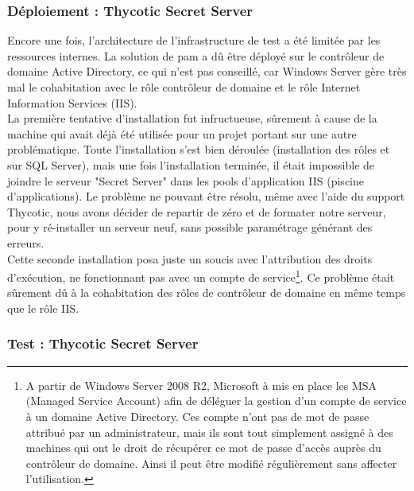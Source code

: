 \subsubsection{Déploiement : Thycotic Secret Server}
\label{par:depss}

Encore une fois, l'architecture de l'infrastructure de test a été limitée par les ressources internes. La solution de \gls{pam} a dû être déployé sur le contrôleur de domaine Active Directory, ce qui n'est pas conseillé, car Windows Server gère très mal le cohabitation avec le rôle contrôleur de domaine et le rôle Internet Information Services (IIS).\\
La première tentative d'installation fut infructueuse, sûrement à cause de la machine qui avait déjà été utilisée pour un projet portant sur une autre problématique. Toute l'installation s'est bien déroulée (installation des rôles et sur SQL Server), mais une fois l'installation terminée, il était impossible de joindre le serveur "Secret Server" dans les pools d'application IIS (piscine d'applications). Le problème ne pouvant être résolu, même avec l'aide du support Thycotic, nous avons décider de repartir de zéro et de formater notre serveur, pour y ré-installer un serveur neuf, sans possible paramétrage générant des erreurs.\\
Cette seconde installation posa juste un soucis avec l'attribution des droits d'exécution, ne fonctionnant pas avec un compte de service\footnote{A partir de Windows Server 2008 R2, Microsoft à mis en place les MSA (Managed Service Account) afin de déléguer la gestion d'un compte de service à un domaine Active Directory. Ces compte n'ont pas de mot de passe attribué par un administrateur, mais ils sont tout simplement assigné à des machines qui ont le droit de récupérer ce mot de passe d'accès auprès du contrôleur de domaine. Ainsi il peut être modifié régulièrement sans affecter l'utilisation.}. Ce problème était sûrement dû à la cohabitation des rôles de contrôleur de domaine en même temps que le rôle IIS.

\subsubsection{Test : Thycotic Secret Server}
\label{par:testss}